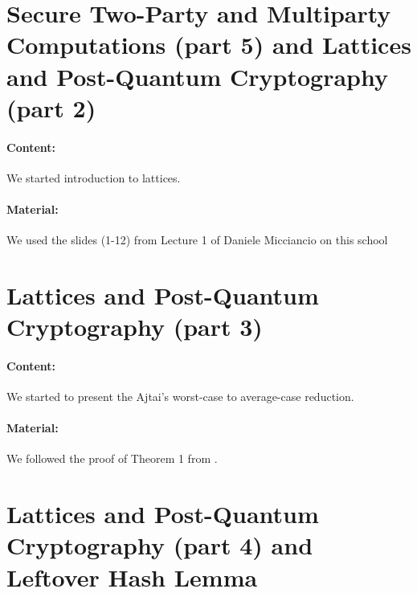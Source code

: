 \documentclass{llncs}
\begin{document}
\section{Secure Two-Party and Multiparty Computations (part 5) and Lattices and Post-Quantum Cryptography (part 2)}

\paragraph{Content:} We started introduction to lattices. 

\paragraph{Material:} We used the slides (1-12) from Lecture 1 of Daniele Micciancio on this school \cite{PQC}

\section{Lattices and Post-Quantum Cryptography (part 3)}

\paragraph{Content:} We started to present the Ajtai's worst-case to average-case reduction.

\paragraph{Material:} We followed the proof of Theorem 1 from \cite{Goldreich2011}.

\section{Lattices and Post-Quantum Cryptography (part 4) and Leftover Hash Lemma}


\printbibliography %
\end{document}
